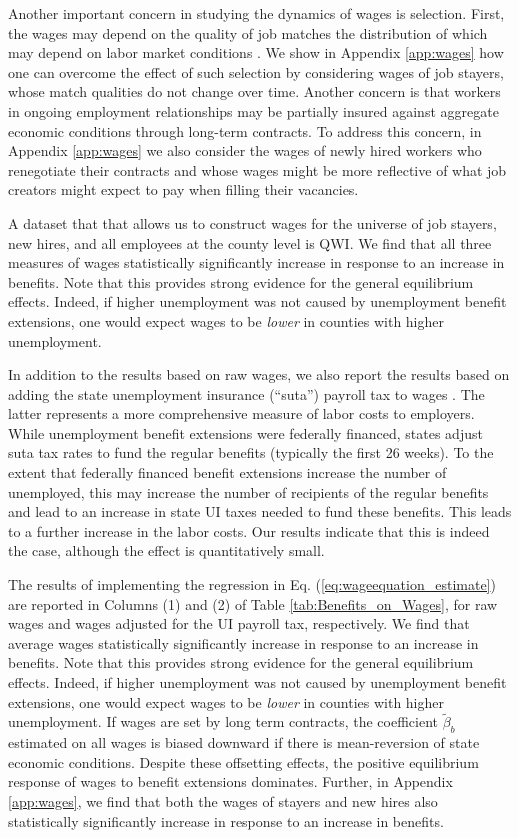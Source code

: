 \documentclass[12pt]{article}
\newcommand{\1}{\mathbf{1}}
\begin{document}
Another important concern in studying the dynamics of wages is selection. First, the wages may depend on the quality of job matches the distribution of which may depend on labor market conditions \citep{gertler+trigari:09, hagedorn+manovskii:13}. We show in Appendix \ref{app:wages} how one can overcome the effect of such selection by considering wages of job stayers, whose match qualities do not change over time. Another concern is that workers in ongoing employment relationships may be partially insured against aggregate economic conditions through long-term contracts. To address this concern, in Appendix \ref{app:wages} we also consider the wages of newly hired workers who renegotiate their contracts and whose wages might be more reflective of what job creators might expect to pay when filling their vacancies. 

A dataset that that allows us to construct wages for the universe of job stayers, new hires, and all employees at the county level is QWI. We find that all three measures of wages statistically significantly increase in response to an increase in benefits. Note that this provides strong evidence for the general equilibrium effects. Indeed, if higher unemployment was not caused by unemployment benefit extensions, one would expect wages to be \emph{lower} in counties with higher unemployment.

In addition to the results based on raw wages, we also report the results based on adding the state unemployment insurance (``suta'') payroll tax to wages \citep{data:doleta-hb394}. The latter represents a more comprehensive measure of labor costs to employers. While unemployment benefit extensions were federally financed, states adjust suta tax rates to fund the regular benefits (typically the first 26 weeks). To the extent that federally financed benefit extensions increase the number of unemployed, this may increase the number of recipients of the regular benefits and lead to an increase in state UI taxes needed to fund these benefits. This leads to a further increase in the labor costs. Our results indicate that this is indeed the case, although the effect is quantitatively small.


The results of implementing the regression in Eq. (\ref{eq:wageequation_estimate}) are reported in Columns (1) and (2) of Table \ref{tab:Benefits_on_Wages}, for raw wages and wages adjusted for the UI payroll tax, respectively. We find that average wages statistically significantly increase in response to an increase in benefits. Note that this provides strong evidence for the general equilibrium effects. Indeed, if higher unemployment was not caused by unemployment benefit extensions, one would expect wages to be \emph{lower} in counties with higher unemployment. If wages are set by long term contracts, the coefficient $\tilde{\beta}_b$ estimated on all wages is biased downward if there is mean-reversion of state economic conditions. Despite these offsetting effects, the positive equilibrium response of wages to benefit extensions dominates. Further, in Appendix \ref{app:wages}, we find that both the wages of stayers and new hires also statistically significantly increase in response to an increase in benefits.
\end{document}
